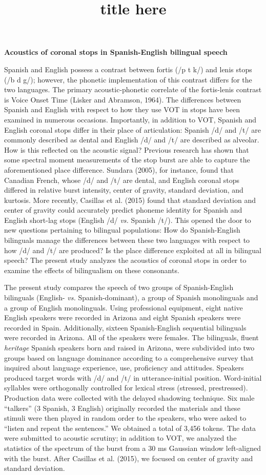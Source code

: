 \documentclass[11pt]{article}
\title{title here}
\date{}
\begin{document}
\begin{center}
	\textbf{Acoustics of coronal stops in Spanish-English bilingual speech}
\end{center}

Spanish and English possess a contrast between fortis (/p t k/) and lenis stops (/b d g/); however, the phonetic implementation of this contrast differs for the two languages. The primary acoustic-phonetic correlate of the fortis-lenis contrast is Voice Onset Time (Lisker and Abramson, 1964). The differences between Spanish and English with respect to how they use VOT in stops have been examined in numerous occasions. Importantly, in addition to VOT, Spanish and English coronal stops differ in their place of articulation: Spanish /d/ and /t/ are commonly described as dental and English /d/ and /t/ are described as alveolar. How is this reflected on the acoustic signal? Previous research has shown that some spectral moment measurements of the stop burst are able to capture the aforementioned place difference. Sundara (2005), for instance, found that Canadian French, whose /d/ and /t/ are dental, and English coronal stops differed in relative burst intensity, center of gravity, standard deviation, and kurtosis. More recently, Casillas et al. (2015) found that standard deviation and center of gravity could accurately predict phoneme identity for Spanish and English short-lag stops (English /d/ \emph{vs.} Spanish /t/). This opened the door to new questions pertaining to bilingual populations: How do Spanish-English bilinguals manage the differences between these two languages with respect to how /d/ and /t/ are produced? Is the place difference exploited at all in bilingual speech? The present study analyzes the acoustics of coronal stops in order to examine the effects of bilingualism on these consonants.

The present study compares the speech of two groups of Spanish-English bilinguals (English- \emph{vs.} Spanish-dominant), a group of Spanish monolinguals and a group of English monolinguals. Using professional equipment, eight native English speakers were recorded in Arizona and eight Spanish speakers were recorded in Spain. Additionally, sixteen Spanish-English sequential bilinguals were recorded in Arizona. All of the speakers were females. The bilinguals, fluent \emph{heritage} Spanish speakers born and raised in Arizona, were subdivided into two groups based on language dominance according to a comprehensive survey that inquired about language experience, use, proficiency and attitudes. Speakers produced target words with /d/ and /t/ in utterance-initial position. Word-initial syllables were orthogonally controlled for lexical stress (stressed, prestressed). Production data were collected with the delayed shadowing technique. Six male ``talkers'' (3 Spanish, 3 English) originally recorded the materials and these stimuli were then played in random order to the speakers, who were asked to ``listen and repeat the sentences.'' We obtained a total of 3,456 tokens. The data were submitted to acoustic scrutiny; in addition to VOT, we analyzed the statistics of the spectrum of the burst from a 30 ms Gaussian window left-aligned with the burst. After Casillas et al. (2015), we focused on center of gravity and standard deviation.
\end{document}
